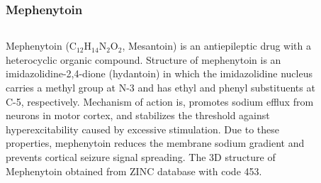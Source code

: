 \frametitle{Mephenytoin}
\begin{columns}
\begin{column}{0.6\linewidth}
	\par Mephenytoin (C$_{12}$H$_{14}$N$_{2}$O$_{2}$, Mesantoin) is an antiepileptic drug with a heterocyclic organic compound.
	Structure of mephenytoin is an imidazolidine-2,4-dione (hydantoin) in which the imidazolidine nucleus carries a methyl group at N-3 and has ethyl and phenyl substituents at C-5, respectively.
	Mechanism of action is, promotes sodium efflux from neurons in motor cortex, and stabilizes the threshold against hyperexcitability caused by excessive stimulation.
	Due to these properties, mephenytoin reduces the membrane sodium gradient and prevents cortical seizure signal spreading.
	The 3D structure of Mephenytoin obtained from ZINC database with code 453.
\end{column}
\begin{column}{0.4\linewidth}
	\begin{figure}
		\texttt{[image: mephenytoin\_str.png]}
		\caption{\centering The structure of Mephenytoin.}
		\label{fig:mph_structure}
	\end{figure}
\end{column}
\end{columns}
